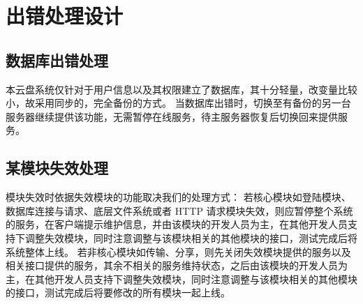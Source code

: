 \chapter{出错处理设计}
    \section{数据库出错处理}
        本云盘系统仅针对于用户信息以及其权限建立了数据库，其十分轻量，改变量比较小，故采用同步的，完全备份的方式。
        当数据库出错时，切换至有备份的另一台服务器继续提供该功能，无需暂停在线服务，待主服务器恢复后切换回来提供服务。
    \section{某模块失效处理}
        模块失效时依据失效模块的功能取决我们的处理方式：
        若核心模块如登陆模块、数据库连接与请求、底层文件系统或者 HTTP 请求模块失效，则应暂停整个系统的服务，在客户端提示维护信息，并由该模块的开发人员为主，在其他开发人员支持下调整失效模块，同时注意调整与该模块相关的其他模块的接口，测试完成后将系统整体上线。
        若非核心模块如传输、分享，则先关闭失效模块提供的服务以及相关接口提供的服务，其余不相关的服务维持状态，之后由该模块的开发人员为主，在其他开发人员支持下调整失效模块，同时注意调整与该模块相关的其他模块的接口，测试完成后将要修改的所有模块一起上线。
